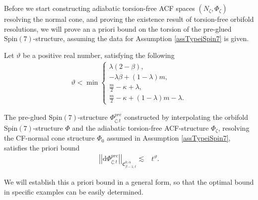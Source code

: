 \documentclass[psamsfonts]{amsart}
\theoremstyle{plain}
\theoremstyle{definition}{
\newtheorem{defi}{Definition}[section]
\newtheorem{ass}{Assumption}
\newtheorem*{nota}{Notation}}
\theoremstyle{remark}{
\newtheorem{rem}{Remark}
\newtheorem{ex}{Example}}
\theoremstyle{plain}{
\newtheorem{thm}{Theorem}[section]
\newtheorem{lem}{Lemma}[section]
\newtheorem{cor}{Corollary}[section]
\newtheorem{prop}{Proposition}[section]
\newtheorem{con}{Conjecture}[section]}
\newenvironment{manualassumption}[1]{%
  \renewcommand\themanualassumptioninner{#1}%
  \manualassumptioninner
}{\endmanualassumptioninner}
\newcommand{\m}[1]{{\mathrm{#1}}}
\begin{document}
Before we start constructing adiabatic torsion-free ACF spaces $(N_\zeta,\Phi_\zeta)$ resolving the normal cone, and proving the existence result of torsion-free orbifold resolutions, we will prove an a priori bound on the torsion of the pre-glued $\m{Spin}(7)$-structure, assuming the data for Assumption \ref{assTypeiSpin7} is given.


\begin{nota}
    Let $\vartheta$ be a positive real number, satisfying the following 
        \begin{align}
        \label{vartheta}
        \vartheta < \min\left\{
                \begin{array}{l}
                \lambda(2- \beta),\\
                -\lambda\beta+ (1-\lambda)m, \\
                \frac{m}{2} - \kappa +  \lambda,\\
                \frac{m}{2} - \kappa +(1-\lambda)m - \lambda.
                \end{array}
                \right.
    \end{align}
\end{nota}


\begin{prop}
\label{apprioriboundonlemma}
The pre-glued $\m{Spin}(7)$-structure $\Phi^{pre}_{\zeta;t}$ constructed by interpolating the orbifold $\m{Spin}(7)$-structure $\Phi$ and the adiabatic torsion-free ACF-structure $\Phi_\zeta$, resolving the CF-normal cone structure $\Phi_0$ assumed in Assumption \ref{assTypeiSpin7}, satisfies the priori bound 
\begin{align}
\label{aprioribound}
    \left|\left|\m{d}\Phi^{pre}_{\zeta;t}\right|\right|_{\mathfrak{C}^{0,\alpha}_{\beta-1;t}}\lesssim&t^{\vartheta}.
\end{align}
\end{prop}


\begin{rem}
We will establish this a priori bound in a general form, so that the optimal bound in specific examples can be easily determined.
\end{rem}
\end{document}
